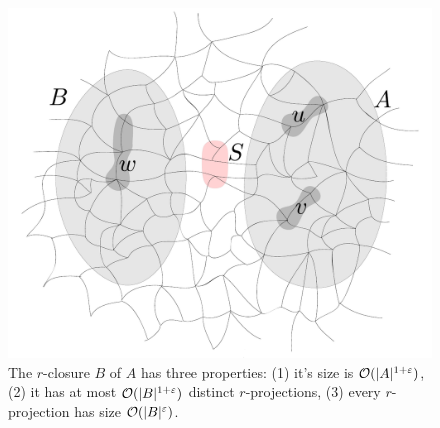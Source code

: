 \begin{figure}[h!]
	\centering
		\includegraphics[scale=0.35,page=3]{pics}
	\caption{The  $r$-closure $B$ of $A$
has three properties:
(1) it's size is  $\mathcal{O}(|A|^{1+\varepsilon})$,
(2) it has at most $\mathcal{O}(|B|^{1+\varepsilon})$ distinct $r$-projections,
(3) every $r$-projection has size  $\mathcal{O}(|B|^\varepsilon)$.
}
	\label{fig:closure}
\end{figure}

